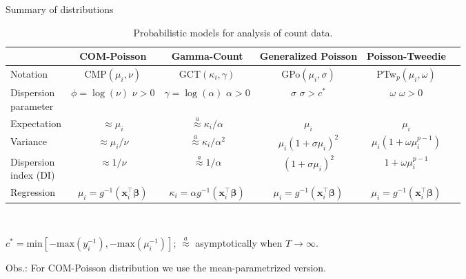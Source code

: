 \documentclass[11pt]{beamer}\usepackage[]{graphicx}\usepackage[]{color}
\begin{document}
\begin{frame}{Summary of distributions}

  \begin{table}[ht]
  \renewcommand{\arraystretch}{1.5}
  \centering \scriptsize
  \caption{Probabilistic models for analysis of count data.}
  \label{tab:models}
  \begin{tabular*}{\textwidth}{m{1.2cm}ccccc}
    \toprule
    & COM-Poisson & Gamma-Count & Generalized Poisson &
      Poisson-Tweedie \\
    \midrule
    Notation &
      CMP$(\mu_i, \nu)$ &
      GCT$(\kappa_i, \gamma)$ &
      GPo$(\mu_i, \sigma)$ &
      PTw$_p(\mu_i, \omega)$ \\
    \makecell[l]{Dispersion \\[-.8mm] parameter} &
      \makecell{$\phi = \log(\nu)$ \\ $\nu > 0$} &
      \makecell{$\gamma = \log(\alpha)$ \\ $\alpha > 0$} &
      \makecell{$\sigma$ \\ $\sigma > c^*$} &
      \makecell{$\omega$ \\ $\omega > 0$} \\
    Expectation &
      $\approx \mu_i$ &
      $\overset{a}{\approx} \kappa_i / \alpha$ &
      $\mu_i$ &
      $\mu_i$ \\
    Variance &
      $\approx \mu_i / \nu$ &
      $\overset{a}{\approx} \kappa_i / \alpha^2$ &
      $\mu_i (1 + \sigma\mu_i)^2$ &
      $\mu_i (1 + \omega\mu_i^{p-1})$ \\[0.1cm]
    \makecell[l]{Dispersion \\[-.8mm] index (DI)} &
      $\approx 1 / \nu$ &
      $\overset{a}{\approx} 1 / \alpha$ &
      $(1 + \sigma\mu_i)^2$ &
      $1 + \omega\mu_i^{p-1}$ \\[-1.5mm]
    Regression &
      $\mu_i = g^{-1}(\bm{x}_i^\top \bm{\beta})$ &
      $\kappa_i = \alpha g^{-1}(\bm{x}_i^\top \bm{\beta}) $ &
      $\mu_i = g^{-1}(\bm{x}_i^\top \bm{\beta})$ &
      $\mu_i = g^{-1}(\bm{x}_i^\top \bm{\beta})$ \\
    \bottomrule
  \end{tabular*}
  \\ \vspace{0.1cm}
  \scriptsize \raggedright
  $c^* = \text{min}[ -\text{max}(y_i^{-1}),
  -\text{max}(\mu_i^{-1})]$;\; $\overset{a}{\approx}$ asymptotically
  when $T \to \infty$.
\end{table}
\vspace{0.2cm}

{\footnotesize Obs.: For COM-Poisson distribution we use the
  mean-parametrized version.}

\end{frame}
\end{document}
